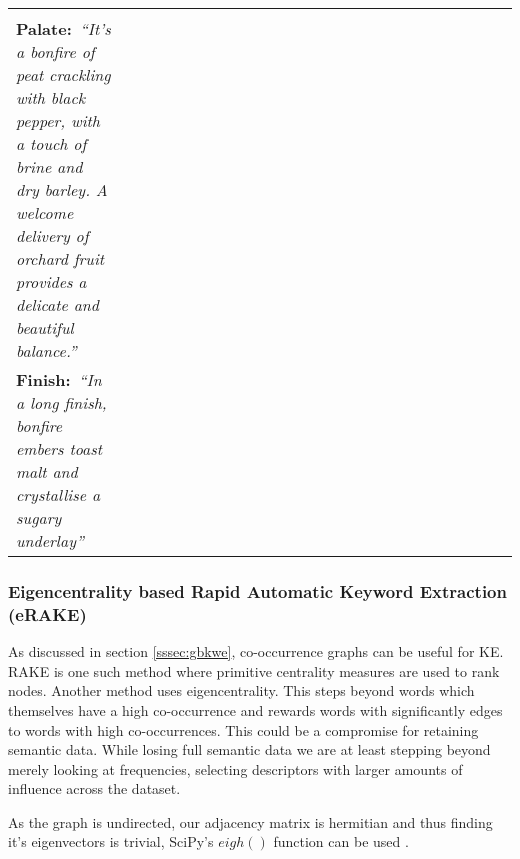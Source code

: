 \begin{table}
\begin{tabular}{p{0.2\linewidth} p{0.8\linewidth}}
\begin{minipage}[t]{0.8\columnwidth}
{            }\\
            \textbf{Palate:}\textit{~``It's a bonfire of peat crackling with black pepper, with a touch of brine 
            and dry barley. A welcome delivery of orchard fruit provides a delicate and beautiful balance.''
            }\\
            \textbf{Finish:}~\textit{``In a long finish, bonfire embers toast malt and crystallise a sugary underlay''
            }\end{minipage}                                                                                                                                                                                                                                                    \\
        \toprule
    \end{tabular}
\end{table}

\subsubsection{Eigencentrality based Rapid Automatic Keyword Extraction (eRAKE)}\label{ssec:erake}
As discussed in section \ref{sssec:gbkwe}, co-occurrence graphs can be useful for KE.  RAKE is one such method where primitive
centrality measures are used to rank nodes.  Another method uses eigencentrality.  This steps beyond words which
themselves have a high co-occurrence and rewards words with significantly edges to words with high co-occurrences.
This could be a compromise for retaining semantic data.  While losing full semantic data we are
at least stepping beyond merely looking at frequencies, selecting descriptors with larger amounts of influence 
across the dataset.

As the graph is undirected, our adjacency matrix is hermitian and thus finding it's eigenvectors is trivial,
SciPy's $eigh()$ function can be used \cite{hubbard_2020, 2020NumPy}.